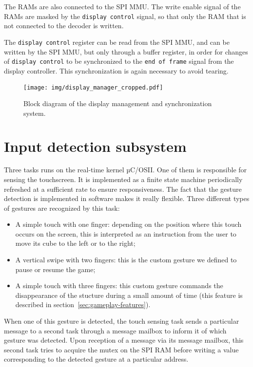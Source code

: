 \documentclass[english, DIV=13]{scrartcl}
\begin{document}
The RAMs are also connected to the SPI MMU. The write enable
signal of the RAMs are masked by the \texttt{display control} signal,
so that only the RAM that is not connected to the decoder is written.

The \texttt{display control} register can be read from the SPI MMU,
and can be written by the SPI MMU, but only through a buffer register,
in order for changes of \texttt{display control} to be synchronized
to the \texttt{end of frame} signal from the display controller.
This synchronization is again necessary to avoid tearing.

\begin{figure}
    \centering
    \texttt{[image: img/display\_manager\_cropped.pdf]}
    \caption{Block diagram of the display management and synchronization system.}
    \label{fig:display-manager}
\end{figure}

\section{Input detection subsystem}
\label{sec:input-det}

Three tasks runs on the real-time kernel µC/OSII. One of them is responsible
for sensing the touchscreen. It is implemented as a finite state machine periodically
refreshed at a sufficient rate to ensure responsiveness. The fact that the gesture
detection is implemented in software makes it really flexible. Three different types of
gestures are recognized by this task:
\begin{itemize}
    \item A simple touch with one finger: depending on the position where this touch
    occurs on the screen, this is interpreted as an instruction from the user to move
    its cube to the left or to the right;
    \item A vertical swipe with two fingers: this is the custom gesture we defined to
    pause or resume the game;
    \item A simple touch with three fingers: this custom gesture commands the
    disappearance of the stucture during a small amount of time (this feature is
    described in section~\ref{sec:gameplay-features}).
\end{itemize}
When one of this gesture is detected, the touch sensing task sends a particular
message to a second task through a message mailbox to inform it of which gesture
was detected. Upon reception of a message via its message mailbox, this second task
tries to acquire the mutex on the SPI RAM before writing a value corresponding
to the detected gesture at a particular address.
\end{document}
